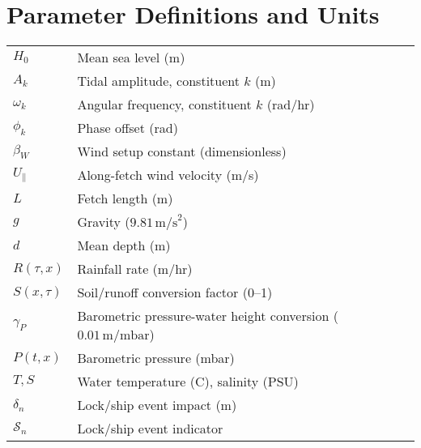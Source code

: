 \documentclass[12pt]{article}
\begin{document}
\section{Parameter Definitions and Units}
\label{app:params}
\begin{tabular}{ll}
$H_0$ & Mean sea level (m) \\
$A_k$ & Tidal amplitude, constituent $k$ (m) \\
$\omega_k$ & Angular frequency, constituent $k$ (rad/hr) \\
$\phi_k$ & Phase offset (rad) \\
$\beta_W$ & Wind setup constant (dimensionless) \\
$U_{\parallel}$ & Along-fetch wind velocity (m/s) \\
$L$ & Fetch length (m) \\
$g$ & Gravity ($9.81\,\mathrm{m/s}^2$) \\
$d$ & Mean depth (m) \\
$R(\tau,x)$ & Rainfall rate (m/hr) \\
$S(x,\tau)$ & Soil/runoff conversion factor (0--1) \\
$\gamma_P$ & Barometric pressure-water height conversion ($0.01\,\mathrm{m}/\mathrm{mbar}$) \\
$P(t,x)$ & Barometric pressure (mbar) \\
$T, S$ & Water temperature (C), salinity (PSU) \\
$\delta_n$ & Lock/ship event impact (m) \\
$\mathcal{S}_n$ & Lock/ship event indicator \\
\end{tabular}
\end{document}
